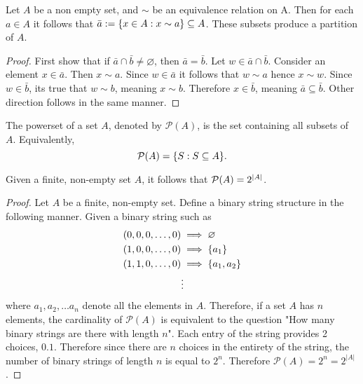 \documentclass[../notes.tex]{subfiles}
\begin{document}
\begin{theorem}
	Let $A$ be a non empty set, and $\sim$ be an equivalence relation on A. Then for each $a \in A$ it follows that $\bar{a} := \qty{x \in A : x \sim a} \subseteq A$. These subsets produce a partition of $A$.
\end{theorem}

\begin{proof}
	First show that if $\bar{a} \cap \bar{b} \neq \varnothing$, then $\bar{a} = \bar{b}$. Let $w \in \bar{a} \cap \bar{b}$. Consider an element $x \in \bar{a}$. Then $x \sim a$. Since $w \in \bar{a}$ it follows that $w \sim a$ hence $x \sim w$. Since $w \in \bar{b}$, its true that $w \sim b$, meaning $x \sim b$. Therefore $x \in \bar{b}$, meaning $\bar{a} \subseteq \bar{b}$. Other direction follows in the same manner.
\end{proof}

\begin{definition}[Powerset]
	The powerset of a set $A$, denoted by $\mathcal{P}(A)$, is the set containing all subsets of $A$. Equivalently,
	\[
		\mathcal{P}(A) = \qty{ S : S \subseteq A }
	.\]
\end{definition}

\begin{theorem}
	Given a finite, non-empty set $A$, it follows that
	$
		\mathcal{P}(A) = 2^{\qty|A|}
	$.
\end{theorem}

\begin{proof}
	Let $A$ be a finite, non-empty set. Define a binary string structure in the following manner. Given a binary string such as 
	\begin{align*}
		\qty(0,0,0,\ldots, 0) &\implies \varnothing \\
		\qty(1,0,0,\ldots, 0) &\implies \qty{a_1} \\
		\qty(1,1,0,\ldots, 0) &\implies \qty{a_1, a_2} \\
													&\vdots
	\end{align*}
	where $a_1, a_2, \ldots a_n$ denote all the elements in $A$. Therefore, if a set $A$ has $n$ elements, the cardinality of $\mathcal{P}(A)$ is equivalent to the question "How many binary strings are there with length $n$". Each entry of the string provides 2 choices, $\qty{0,1}$. Therefore since there are $n$ choices in the entirety of the string, the number of binary strings of length $n$ is equal to $2^n$. Therefore $\mathcal{P}(A) = 2^n = 2^{|A|}$.
\end{proof}
\end{document}
